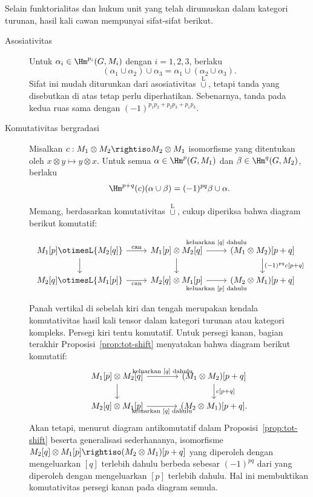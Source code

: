 Selain funktorialitas dan hukum unit yang telah dirumuskan dalam kategori
turunan, hasil kali cawan mempunyai sifat-sifat berikut.

\begin{description}
	\item[Asosiativitas] Untuk $\alpha_i\in\Hm^{p_i}(G,M_i)$ dengan
	$i=1,2,3$, berlaku
	\[ (\alpha_1 \cup \alpha_2) \cup \alpha_3 = \alpha_1 \cup (\alpha_2 \cup \alpha_3). \]
	Sifat ini mudah diturunkan dari asosiativitas
	$\overset{\mathrm{L}}{\cup}$, tetapi tanda yang disebutkan di atas tetap
	perlu diperhatikan. Sebenarnya, tanda pada kedua ruas sama dengan
	$(-1)^{p_1p_2+p_2p_3+p_1p_3}$.

	\item[Komutativitas bergradasi] Misalkan
	$c:M_1\otimes M_2\rightiso M_2\otimes M_1$ isomorfisme yang ditentukan oleh
	$x\otimes y\mapsto y\otimes x$. Untuk semua
	$\alpha\in\Hm^p(G,M_1)$ dan $\beta\in\Hm^q(G,M_2)$, berlaku
	\[ \Hm^{p+q}(c)(\alpha \cup \beta) = (-1)^{pq} \beta \cup \alpha. \]

	Memang, berdasarkan komutativitas $\overset{\mathrm{L}}{\cup}$, cukup
	diperiksa bahwa diagram berikut komutatif:
	\[\begin{tikzcd}
		{M_1[p]} \otimesL {M_2[q]} \arrow[d] \arrow[r, "\text{can}"] & {M_1[p]} \otimes {M_2[q]} \arrow[d] \arrow[r, "\text{keluarkan $[q]$ dahulu}" inner sep=0.6em] & (M_1 \otimes M_2){[p+q]} \arrow[d, "{(-1)^{pq} c[p+q]}"] \\
		{M_2[q]} \otimesL {M_1[p]} \arrow[r, "\text{can}"'] & {M_2[q]} \otimes {M_1[p]} \arrow[r, "\text{keluarkan $[p]$ dahulu}"' inner sep=0.6em] & (M_2 \otimes M_1) {[p+q]}
	\end{tikzcd}\]
	Panah vertikal di sebelah kiri dan tengah merupakan kendala komutativitas
	hasil kali tensor dalam kategori turunan atau kategori kompleks. Persegi kiri
	tentu komutatif. Untuk persegi kanan, bagian terakhir
	Proposisi~\ref{prop:tot-shift} menyatakan bahwa diagram berikut komutatif:
	\[\begin{tikzcd}[column sep=large]
		{M_1[p]} \otimes {M_2[q]} \arrow[d] \arrow[r, "\text{keluarkan $[q]$ dahulu}"] & (M_1 \otimes M_2) {[p+q]} \arrow[d, "{c[p+q]}"] \\
		{M_2[q]} \otimes {M_1[p]} \arrow[r, "\text{keluarkan $[q]$ dahulu}"'] & (M_2 \otimes M_1) {[p+q]}.
	\end{tikzcd}\]
	Akan tetapi, menurut diagram antikomutatif dalam
	Proposisi~\ref{prop:tot-shift} beserta generalisasi sederhananya,
	isomorfisme
	$M_2[q]\otimes M_1[p]\rightiso(M_2\otimes M_1)[p+q]$ yang diperoleh dengan
	mengeluarkan $[q]$ terlebih dahulu berbeda sebesar $(-1)^{pq}$ dari yang
	diperoleh dengan mengeluarkan $[p]$ terlebih dahulu. Hal ini membuktikan
	komutativitas persegi kanan pada diagram semula.


\end{description}
